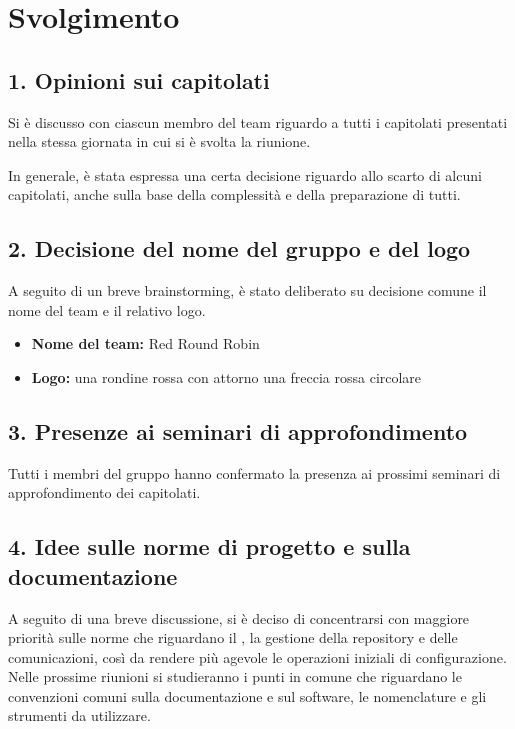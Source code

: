 \newpage
\section*{Svolgimento}

\subsection*{1. Opinioni sui capitolati}

Si è discusso con ciascun membro del team riguardo a tutti i capitolati presentati nella stessa giornata in cui si è svolta la riunione. 

In generale, è stata espressa una certa decisione riguardo allo scarto di alcuni capitolati, anche sulla base della complessità e della preparazione di tutti.

\subsection*{2. Decisione del nome del gruppo e del logo}

A seguito di un breve brainstorming, è stato deliberato su decisione comune il nome del team e il relativo logo.

\begin{itemize}
	\item \textbf{Nome del team:} Red Round Robin
	\item \textbf{Logo:} una rondine rossa con attorno una freccia rossa circolare
\end{itemize}

\subsection*{3. Presenze ai seminari di approfondimento}

Tutti i membri del gruppo hanno confermato la presenza ai prossimi seminari di approfondimento dei capitolati.

\subsection*{4. Idee sulle norme di progetto e sulla documentazione}

A seguito di una breve discussione, si è deciso di concentrarsi con maggiore priorità sulle norme che riguardano il , la gestione della repository e delle comunicazioni, così da rendere più agevole le operazioni iniziali di configurazione.
Nelle prossime riunioni si studieranno i punti in comune che riguardano le convenzioni comuni sulla documentazione e sul software, le nomenclature e gli strumenti da utilizzare. 

